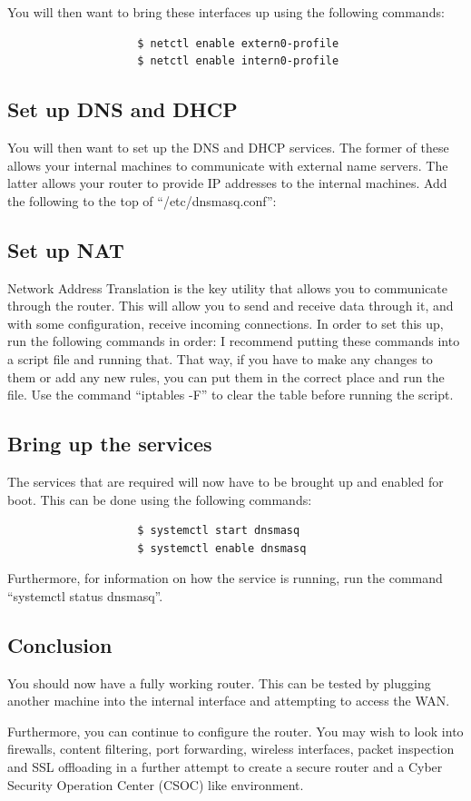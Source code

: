 				You will then want to bring these interfaces up using the following commands:
				\begin{verbatim}
					$ netctl enable extern0-profile
					$ netctl enable intern0-profile
				\end{verbatim}

			\subsection{Set up DNS and DHCP}
				You will then want to set up the DNS and DHCP services.
				The former of these allows your internal machines to communicate with external name servers.
				The latter allows your router to provide IP addresses to the internal machines.
				Add the following to the top of ``/etc/dnsmasq.conf'':
				
			\subsection{Set up NAT}
				Network Address Translation is the key utility that allows you to communicate through the router.
				This will allow you to send and receive data through it, and with some configuration, receive incoming connections.
				In order to set this up, run the following commands in order:
				I recommend putting these commands into a script file and running that.
				That way, if you have to make any changes to them or add any new rules, you can put them in the correct place and run the file.
				Use the command ``iptables -F'' to clear the table before running the script.

			\subsection{Bring up the services}
				The services that are required will now have to be brought up and enabled for boot.
				This can be done using the following commands:
				\begin{verbatim}
					$ systemctl start dnsmasq
					$ systemctl enable dnsmasq
				\end{verbatim}
				Furthermore, for information on how the service is running, run the command ``systemctl status dnsmasq''.

			\subsection{Conclusion}
				You should now have a fully working router.
				This can be tested by plugging another machine into the internal interface and attempting to access the WAN.

				Furthermore, you can continue to configure the router.
				You may wish to look into firewalls, content filtering, port forwarding, wireless interfaces, packet inspection and SSL offloading in a further attempt to create a secure router and a Cyber Security Operation Center (CSOC) like environment.

